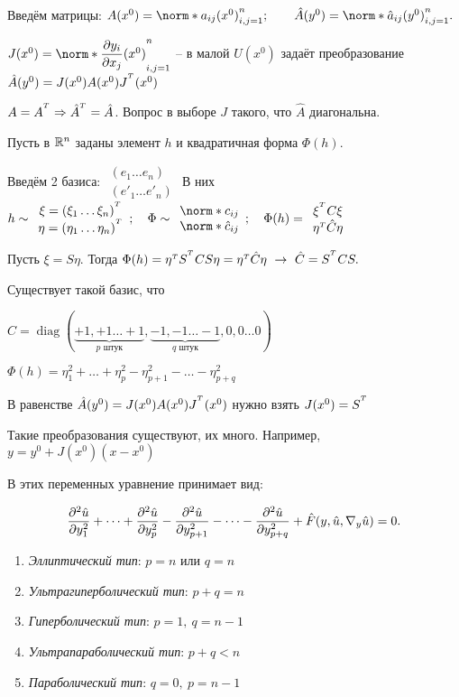 \documentclass[../main.tex]{subfiles}
\begin{document}
Введём матрицы: $A(x^0) = \norm*{a_{ij}(x^0)}_{i,j=1}^n; \qquad \hat{A}(y^0) = \norm*{\hat{a}_{ij}(y^0)}_{i,j=1}^n.$

$J(x^0) = \norm*{\pd{y_i}{x_j}(x^0)}_{i,j=1}^n$ -- в малой $U(x^0)$ задаёт преобразование $\hat{A}(y^0) = J(x^0)A(x^0)J^{{}^T}(x^0)$ 

$A = A^{{}^T} \Rightarrow \hat{A}^{{}^T} = \hat{A}$. Вопрос в выборе $J$ такого, что $\hat{A}$ диагональна.

Пусть в $\mathbb{R}^n$ заданы элемент $h$ и квадратичная форма $\Phi(h).$

Введём 2 базиса: $\begin{array}{c} \left(e_1 \dots e_n\right) \\ \left(e'_1 \dots e'_n\right) \end{array}$ В них $h \sim \begin{array}{c} \xi = (\xi_1 \dots \xi_n)^\Transp \\ \eta = (\eta_1 \dots \eta_n)^\Transp \end{array}; \quad \Phi \sim \begin{array}{c} \norm*{c_{ij}} \\ \norm*{\hat{c}_{ij}}
\end{array}; \quad \Phi(h) = \begin{array}{c}
\xi^\Transp C \xi \\ \eta^\transp \hat{C} \eta
\end{array}$

Пусть $\xi = S\eta$. Тогда $\Phi(h) = \eta^{\scriptscriptstyle T} S^{{}^T} C S \eta = \eta^{\scriptscriptstyle T}\hat{C}\eta \ \rightarrow\ \hat{C} = S^{{}^T} C S.$

Существует такой базис, что

$\hat{C} = \operatorname{diag}(\underbrace{+1, +1 \dots +1}_{p\text{ штук}}, \underbrace{-1, -1 \dots -1}_{q\text{ штук}}, 0, 0 \dots 0)$

$\Phi(h) = \eta^2_1 + \dots + \eta^2_p - \eta^2_{p+1} - \dots - \eta^2_{p+q}$

В равенстве $\hat{A}(y^0) = J(x^0)A(x^0)J^{{}^T}(x^0)$ нужно взять $J(x^0) = S^{{}^T}$

Такие преобразования существуют, их много. Например, $y = y^0 + J(x^0)(x-x^0)$

В этих переменных уравнение принимает вид:

$$\dfrac{\partial^{2} \hat{u}}{\partial y_1^{2}} + \dots + \dfrac{\partial^{2} \hat{u}}{\partial y_p^{2}} - \dfrac{\partial^{2} \hat{u}}{\partial y_{p+1}^{2}} - \dots - \dfrac{\partial^{2} \hat{u}}{\partial y_{p+q}^{2}} + \hat{F}(y, \hat{u}, \nabla_y\hat{u}) = 0.$$

\begin{enumerate}
	\item \textit{Эллиптический тип}: $p = n$ или $q = n$
	\item \textit{Ультрагиперболический тип}: $p+q = n$
	\item \textit{Гиперболический тип}: $p = 1,\ q = n-1$
	\item \textit{Ультрапараболический тип}: $p + q < n$
	\item \textit{Параболический тип}: $q = 0,\ p = n-1$
\end{enumerate}
\end{document}
